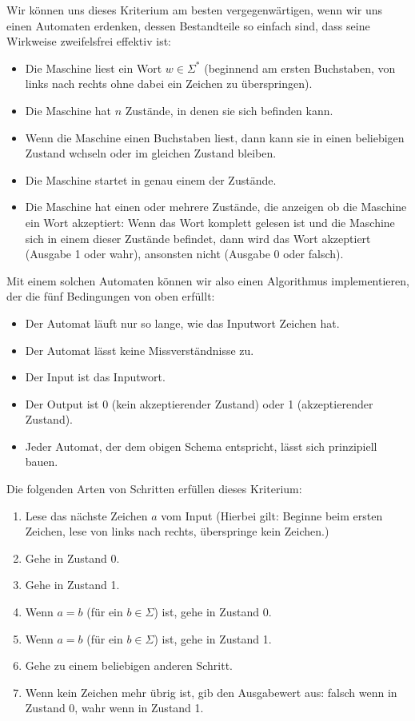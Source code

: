 Wir können uns dieses Kriterium am besten vergegenwärtigen,
wenn wir uns einen Automaten erdenken,
dessen Bestandteile so einfach sind,
dass seine Wirkweise zweifelsfrei effektiv ist:

\begin{itemize}
    \item Die Maschine liest ein Wort $w \in \Sigma^*$ (beginnend am ersten Buchstaben, von links nach rechts ohne dabei ein Zeichen zu überspringen).
    \item Die Maschine hat $n$ Zustände, in denen sie sich befinden kann.
    \item Wenn die Maschine einen Buchstaben liest, dann kann sie in einen beliebigen Zustand wchseln oder im gleichen Zustand bleiben.
    \item Die Maschine startet in genau einem der Zustände.
    \item Die Maschine hat einen oder mehrere Zustände, die anzeigen
        ob die Maschine ein Wort akzeptiert:
        Wenn das Wort komplett gelesen ist
        und die Maschine sich in einem dieser Zustände befindet,
        dann wird das Wort akzeptiert (Ausgabe 1 oder wahr),
        ansonsten nicht (Ausgabe 0 oder falsch).
\end{itemize}

Mit einem solchen Automaten können wir also einen Algorithmus implementieren, 
der die fünf Bedingungen von oben erfüllt:
\begin{itemize}
    \item Der Automat läuft nur so lange, wie das Inputwort Zeichen hat.
    \item Der Automat lässt keine Missverständnisse zu.  
    \item Der Input ist das Inputwort.
    \item Der Output ist 0 (kein akzeptierender Zustand) oder 1 (akzeptierender Zustand).
    \item Jeder Automat, der dem obigen Schema entspricht, lässt sich prinzipiell bauen.
\end{itemize}


Die folgenden Arten von Schritten erfüllen dieses Kriterium:
\begin{enumerate}
    \item Lese das nächste Zeichen $a$ vom Input (Hierbei gilt:
            Beginne beim ersten Zeichen,
            lese von links nach rechts,
            überspringe kein Zeichen.)
    \item Gehe in Zustand 0.
    \item Gehe in Zustand 1.
    \item Wenn $a = b$ (für ein $b \in \Sigma$) ist, gehe in Zustand 0.
    \item Wenn $a = b$ (für ein $b \in \Sigma$) ist, gehe in Zustand 1.
    \item Gehe zu einem beliebigen anderen Schritt.
    \item Wenn kein Zeichen mehr übrig ist, gib den Ausgabewert aus:
        falsch wenn in Zustand 0, wahr wenn in Zustand 1.

\end{enumerate}

